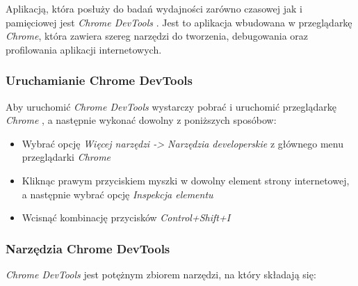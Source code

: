 \documentclass[polish, twoside, 12pt]{mwart}
\begin{document}
Aplikacją, która posłuży do badań wydajności zarówno czasowej jak i pamięciowej jest \emph{Chrome DevTools} \cite{chrome-devtools}. Jest to aplikacja wbudowana w przeglądarkę \emph{Chrome}, która zawiera szereg narzędzi do tworzenia, debugowania oraz profilowania aplikacji internetowych. 

\subsubsection{Uruchamianie Chrome DevTools}

Aby uruchomić \emph{Chrome DevTools} wystarczy pobrać i uruchomić przeglądarkę \emph{Chrome} \cite{chrome}, a następnie wykonać dowolny z poniższych sposóbow:

\begin{itemize}
  \item Wybrać opcję \emph{Więcej narzędzi -> Narzędzia developerskie} z głównego menu przeglądarki \emph{Chrome}
  \item Kliknąc prawym przyciskiem myszki w dowolny element strony internetowej, a następnie wybrać opcję \emph{Inspekcja elementu}
  \item Wcisnąć kombinację przycisków \emph{Control+Shift+I}
\end{itemize}

\subsubsection{Narzędzia Chrome DevTools}

\emph{Chrome DevTools} jest potężnym zbiorem narzędzi, na który składają się:
\end{document}
